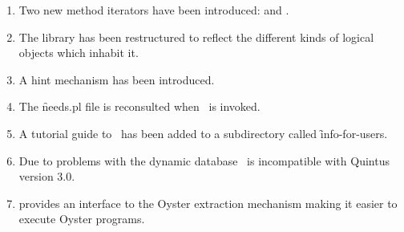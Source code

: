 \begin{enumerate}
\item Two new method iterators have been introduced: 
and .

\item The library has been restructured to reflect the different
kinds of logical objects which inhabit it.

\item A hint mechanism has been introduced.

\item The \f{needs.pl} file is reconsulted when \clam\ is
invoked.

\item A tutorial guide to \clam\ has been added to a subdirectory called \f{info-for-users}.

\item Due to problems with the dynamic database \clam\ is incompatible
with Quintus version 3.0.

\item {} provides an interface to the Oyster extraction
      mechanism making it easier to execute Oyster programs.


\end{enumerate}


